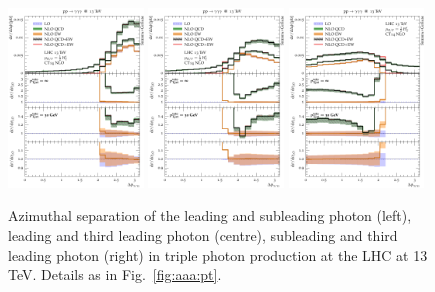\begin{figure}[t!]
  \centering
  \includegraphics[width=0.32\textwidth]{figs_aaa/dphi_y1y2}
  \includegraphics[width=0.32\textwidth]{figs_aaa/dphi_y1y3}
  \includegraphics[width=0.32\textwidth]{figs_aaa/dphi_y2y3}
  \caption{
    Azimuthal separation of the leading and subleading photon (left),
    leading and third leading photon (centre), subleading and third leading 
    photon (right) 
    in triple photon production at the LHC at 13\,TeV. 
    Details as in Fig.\ \ref{fig:aaa:pt}.
    \label{fig:aaa:dphi}
  }
\end{figure}

